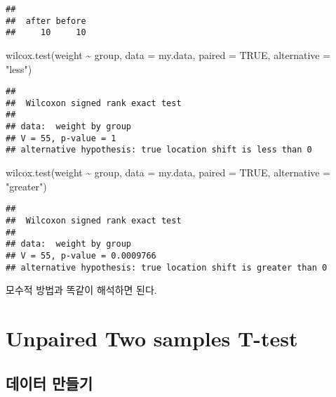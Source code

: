 \documentclass[
]{article}
\newenvironment{Shaded}{\begin{snugshade}}{\end{snugshade}}
\newcommand{\AttributeTok}[1]{\textcolor[rgb]{0.77,0.63,0.00}{#1}}
\newcommand{\ConstantTok}[1]{\textcolor[rgb]{0.00,0.00,0.00}{#1}}
\newcommand{\FunctionTok}[1]{\textcolor[rgb]{0.00,0.00,0.00}{#1}}
\newcommand{\NormalTok}[1]{#1}
\newcommand{\SpecialCharTok}[1]{\textcolor[rgb]{0.00,0.00,0.00}{#1}}
\newcommand{\StringTok}[1]{\textcolor[rgb]{0.31,0.60,0.02}{#1}}
\begin{document}
\begin{verbatim}
## 
##  after before 
##     10     10
\end{verbatim}

\begin{Shaded}
\begin{Highlighting}[]
\FunctionTok{wilcox.test}\NormalTok{(weight }\SpecialCharTok{\textasciitilde{}}\NormalTok{ group, }\AttributeTok{data =}\NormalTok{ my.data, }\AttributeTok{paired =} \ConstantTok{TRUE}\NormalTok{, }\AttributeTok{alternative =} \StringTok{"less"}\NormalTok{)}
\end{Highlighting}
\end{Shaded}

\begin{verbatim}
## 
##  Wilcoxon signed rank exact test
## 
## data:  weight by group
## V = 55, p-value = 1
## alternative hypothesis: true location shift is less than 0
\end{verbatim}

\begin{Shaded}
\begin{Highlighting}[]
\FunctionTok{wilcox.test}\NormalTok{(weight }\SpecialCharTok{\textasciitilde{}}\NormalTok{ group, }\AttributeTok{data =}\NormalTok{ my.data, }\AttributeTok{paired =} \ConstantTok{TRUE}\NormalTok{, }\AttributeTok{alternative =} \StringTok{"greater"}\NormalTok{)}
\end{Highlighting}
\end{Shaded}

\begin{verbatim}
## 
##  Wilcoxon signed rank exact test
## 
## data:  weight by group
## V = 55, p-value = 0.0009766
## alternative hypothesis: true location shift is greater than 0
\end{verbatim}

모수적 방법과 똑같이 해석하면 된다.

\hypertarget{unpaired-two-samples-t-test}{%
\section{Unpaired Two samples T-test}\label{unpaired-two-samples-t-test}}

\hypertarget{uxb370uxc774uxd130-uxb9ccuxb4e4uxae30-2}{%
\subsection{데이터 만들기}\label{uxb370uxc774uxd130-uxb9ccuxb4e4uxae30-2}}
\end{document}
